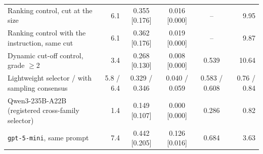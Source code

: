 \begin{table}[t]
{\begin{tabular}{lrcccr}
\quad Ranking control, cut at the \qss{} size & 6.1 & 0.355 [0.176] & 0.016 [0.000] & -- & 9.95 \\
\quad Ranking control with the \qss{} instruction, same cut & 6.1 & 0.362 [0.176] & 0.019 [0.000] & -- & 9.87 \\
\quad Dynamic cut-off control, grade $\ge$2 & 3.4 & 0.268 [0.130] & 0.008 [0.000] & 0.539 & 10.64 \\
Lightweight selector / with sampling consensus & 5.8 / 6.4 & 0.329 / 0.346 & 0.040 / 0.059 & 0.583 / 0.608 & 0.76 / 0.84 \\
Qwen3-235B-A22B (registered cross-family selector) & 1.4 & 0.149 [0.107] & 0.000 [0.000] & 0.286 & 0.82 \\
\texttt{gpt-5-mini}, same prompt & 7.4 & 0.442 [0.205] & 0.126 [0.016] & 0.684 & 3.63 \\
\bottomrule
\end{tabular}}
\end{table}

